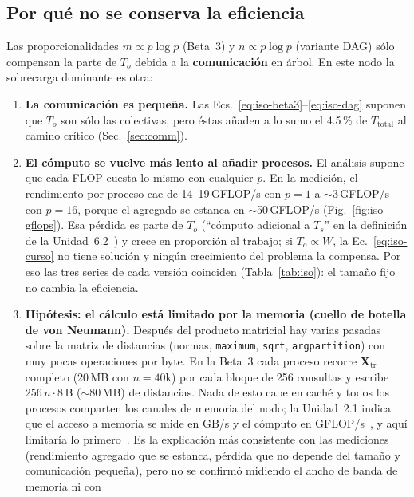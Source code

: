\documentclass[11pt,a4paper]{article}
\newcommand{\ntr}{n}   %
\newcommand{\mte}{m}   %
\newcommand{\Xtr}{\mathbf{X}_{\text{tr}}}
\newcommand{\Ttot}{T_{\text{total}}}
\begin{document}
\subsection{Por qué no se conserva la eficiencia}
\label{sec:debil}
Las proporcionalidades $\mte\propto p\log p$ (Beta~3) y $\ntr\propto p\log p$ (variante DAG) sólo
compensan la parte de $T_o$ debida a la \textbf{comunicación} en árbol. En este nodo la sobrecarga
dominante es otra:

\begin{enumerate}
  \item \textbf{La comunicación es pequeña.} Las Ecs.~\eqref{eq:iso-beta3}--\eqref{eq:iso-dag}
        suponen que $T_o$ son sólo las colectivas, pero éstas añaden a lo sumo el 4.5\,\% de $\Ttot$
        al camino crítico (Sec.~\ref{sec:comm}).
  \item \textbf{El cómputo se vuelve más lento al añadir procesos.} El análisis supone que cada FLOP
        cuesta lo mismo con cualquier $p$. En la medición, el rendimiento por proceso cae de
        14--19\,GFLOP/s con $p=1$ a $\sim$3\,GFLOP/s con $p=16$, porque el agregado se estanca en
        $\sim$50\,GFLOP/s (Fig.~\ref{fig:iso-gflops}). Esa pérdida es parte de $T_o$
        (``cómputo adicional a $T_s$'' en la definición de la Unidad~6.2~\cite{fiestasU62}) y crece
        en proporción al trabajo; si $T_o\propto W$, la Ec.~\eqref{eq:iso-curso} no tiene solución
        y ningún crecimiento del problema la compensa. Por eso las tres series de cada versión
        coinciden (Tabla~\ref{tab:iso}): el tamaño fijo no cambia la eficiencia.
  \item \textbf{Hipótesis: el cálculo está limitado por la memoria (cuello de botella de von
        Neumann).} Después del producto matricial hay varias pasadas sobre la matriz de distancias
        (normas, \texttt{maximum}, \texttt{sqrt}, \texttt{argpartition}) con muy pocas operaciones por
        byte. En la Beta~3 cada proceso recorre $\Xtr$ completo (20\,MB con $\ntr=40$k) por cada bloque
        de 256 consultas y escribe $256\,\ntr\cdot8$\,B ($\sim$80\,MB) de distancias. Nada de esto cabe
        en caché y todos los procesos comparten los canales de memoria del nodo; la Unidad~2.1 indica
        que el acceso a memoria se mide en GB/s y el cómputo en GFLOP/s~\cite{fiestasU21}, y aquí
        limitaría lo primero~\cite{fiestasU1,backus1978}. Es la explicación más consistente con las
        mediciones (rendimiento agregado que se estanca, pérdida que no depende del tamaño y
        comunicación pequeña), pero no se confirmó midiendo el ancho de banda de memoria ni con

\end{enumerate}
\end{document}
